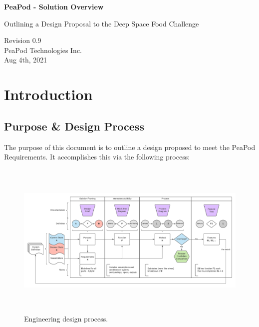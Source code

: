 \documentclass{../tex/report}
\begin{document}
\begin{titlepage}
    \begin{center}
        \vspace*{1.2cm}

        \textbf{\large{PeaPod - Solution Overview}}

        \vspace{0.5cm}

        Outlining a Design Proposal to the Deep Space Food Challenge

        \vfill
        
        \vspace{.75cm}

        Revision 0.9\\
        PeaPod Technologies Inc.\\
        Aug 4th, 2021

    \end{center}
\end{titlepage}

\thispagestyle{plain}

\tableofcontents
\newpage

\section{Introduction}
\label{sec:intro}

\subsection{Purpose \& Design Process}
\label{sec:purpose}

The purpose of this document is to outline a design proposed to meet the PeaPod Requirements. It accomplishes this via the following process:

\begin{figure}[h]
    \centering
    \includegraphics[height=7.55cm,angle=90,origin=c]{images/designprocess.png}
    \hfill
    \caption{Engineering design process.}
\end{figure}
\end{document}
